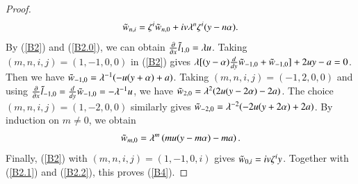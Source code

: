 \documentclass[12pt,reqno]{amsart}
\numberwithin{equation}{section}
\begin{document}
\begin{proof}
\begin{equation}\label{B2.1}
\aligned
\Tilde{w}_{n,i}=\zeta^i\Tilde{w}_{n,0}+iv\lambda^n\zeta^i(y-n\alpha).
\endaligned
\end{equation}
By (\ref{B2}) and (\ref{B2.0}), we can obtain $\frac{\partial}{\partial{x}}\Tilde{l}_{1,0}=\lambda u$. Taking $(m,n,i,j)=(1,-1,0,0)$ in (\ref{B2}) gives $\lambda[(y-\alpha)\frac{d}{d{y}}\Tilde{w}_{-1,0}+\Tilde{w}_{-1,0}]+2uy-a=0$. Then we have $\Tilde{w}_{-1,0}=\lambda^{-1}(-u(y+\alpha)+a)$. Taking $(m,n,i,j)=(-1,2,0,0)$ and using $\frac{\partial}{\partial{x}}\Tilde{l}_{-1,0}=\frac{d}{d{y}}\Tilde{w}_{-1,0}=-\lambda^{-1}u$, we have  $\Tilde{w}_{2,0}=\lambda^{2}(2u(y-2\alpha)-2a)$. The choice $(m,n,i,j)=(1,-2,0,0)$ similarly gives $\Tilde{w}_{-2,0}=\lambda^{-2}(-2u(y+2\alpha)+2a)$.
By induction on $m\neq0$, we obtain 
\begin{equation}\label{B2.2}
\aligned
\Tilde{w}_{m,0}=\lambda^m\left(mu(y-m\alpha)-ma\right).
\endaligned
\end{equation}
  Finally, (\ref{B2}) with $(m,n,i,j)=(1,-1,0,i)$ gives $\Tilde{w}_{0,i}=iv\zeta^iy$. Together with (\ref{B2.1}) and (\ref{B2.2}), this proves (\ref{B4}). 
\end{proof}
\end{document}
